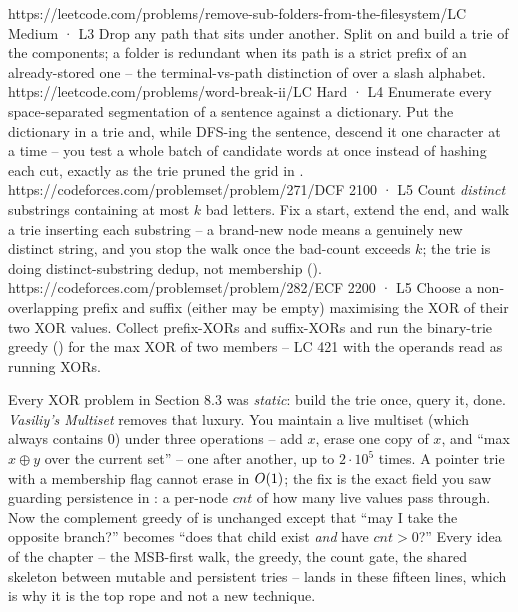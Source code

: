 \begin{mixedset}
    {https://leetcode.com/problems/remove-sub-folders-from-the-filesystem/}{LC Medium · L3}
    {Drop any path that sits under another. Split on \code{/} and build a trie of the components; a folder is
    redundant when its path is a strict prefix of an already-stored one -- the terminal-vs-path distinction of
     over a slash alphabet.}
    {https://leetcode.com/problems/word-break-ii/}{LC Hard · L4}
    {Enumerate every space-separated segmentation of a sentence against a dictionary. Put the dictionary in a
    trie and, while DFS-ing the sentence, descend it one character at a time -- you test a whole batch of
    candidate words at once instead of hashing each cut, exactly as the trie pruned the grid in
    .}
    {https://codeforces.com/problemset/problem/271/D}{CF 2100 · L5}
    {Count \emph{distinct} substrings containing at most $k$ bad letters. Fix a start, extend the end, and
    walk a trie inserting each substring -- a brand-new node means a genuinely new distinct string, and you
    stop the walk once the bad-count exceeds $k$; the trie is doing distinct-substring dedup, not membership
    ().}
    {https://codeforces.com/problemset/problem/282/E}{CF 2200 · L5}
    {Choose a non-overlapping prefix and suffix (either may be empty) maximising the XOR of their two XOR
    values. Collect prefix-XORs and suffix-XORs and run the  binary-trie greedy
    () for the max XOR of two members -- LC 421 with the operands read as running
    XORs.}
\end{mixedset}


\begin{notebox}
Every XOR problem in Section 8.3 was \emph{static}: build the trie once, query it, done. \emph{Vasiliy's
Multiset} removes that luxury. You maintain a live multiset (which always contains $0$) under three
operations -- add $x$, erase one copy of $x$, and ``max $x \oplus y$ over the current set'' -- one after
another, up to $2\cdot10^{5}$ times. A pointer trie with a membership flag cannot erase in
$O(1)$; the fix is the exact field you saw guarding persistence in : a per-node
$\mathit{cnt}$ of how many live values pass through. Now the complement greedy of  is
unchanged except that ``may I take the opposite branch?'' becomes ``does that child exist \emph{and} have
$\mathit{cnt}>0$?'' Every idea of the chapter -- the MSB-first walk, the greedy, the count gate, the shared
skeleton between mutable and persistent tries -- lands in these fifteen lines, which is why it is the top
rope and not a new technique.
\end{notebox}

